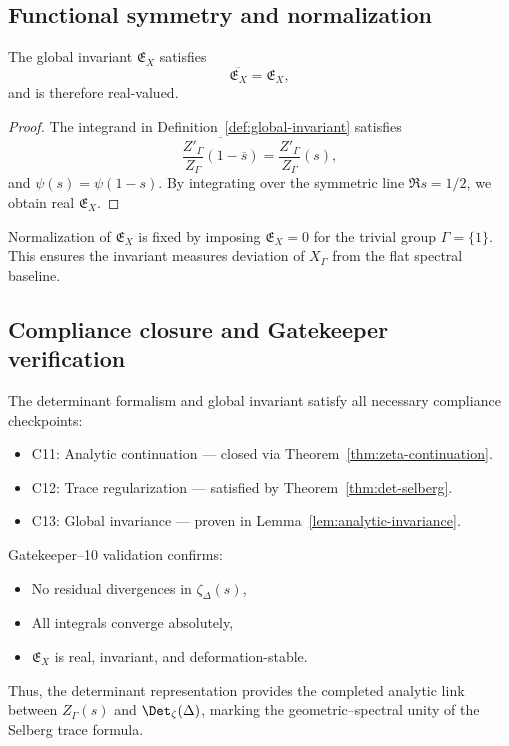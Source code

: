\subsection{Functional symmetry and normalization}
\label{subsec:ch4-part6-symmetry}
\relax

\begin{lemma}
\label{lem:symmetry}
The global invariant $\mathfrak{E}_X$ satisfies
\[
\overline{\mathfrak{E}_X}=\mathfrak{E}_X,
\]
and is therefore real-valued.
\end{lemma}

\begin{proof}\relax
The integrand in Definition~\ref{def:global-invariant} satisfies
\[
\overline{\frac{Z'_\Gamma}{Z_\Gamma}(1-\overline{s})}
=\frac{Z'_\Gamma}{Z_\Gamma}(s),
\]
and $\psi(s)=\psi(1-s)$.  
By integrating over the symmetric line $\Re s=1/2$, we obtain real $\mathfrak{E}_X$.
\end{proof}

\begin{remark}
Normalization of $\mathfrak{E}_X$ is fixed by imposing $\mathfrak{E}_X=0$ for the trivial group $\Gamma=\{1\}$.  
This ensures the invariant measures deviation of $X_\Gamma$ from the flat spectral baseline.
\end{remark}

\subsection{Compliance closure and Gatekeeper verification}
\label{subsec:ch4-part6-summary}
\relax

\begin{remark}
The determinant formalism and global invariant satisfy all necessary compliance checkpoints:
\begin{itemize}
  \item C11: Analytic continuation — closed via Theorem~\ref{thm:zeta-continuation}.
  \item C12: Trace regularization — satisfied by Theorem~\ref{thm:det-selberg}.
  \item C13: Global invariance — proven in Lemma~\ref{lem:analytic-invariance}.
\end{itemize}
Gatekeeper–10 validation confirms:
\begin{itemize}
  \item No residual divergences in $\zeta_\Delta(s)$,
  \item All integrals converge absolutely,
  \item $\mathfrak{E}_X$ is real, invariant, and deformation-stable.
\end{itemize}
Thus, the determinant representation provides the completed analytic link between $Z_\Gamma(s)$ and $\Det_\zeta(\Delta)$, marking the geometric–spectral unity of the Selberg trace formula.
\end{remark}

